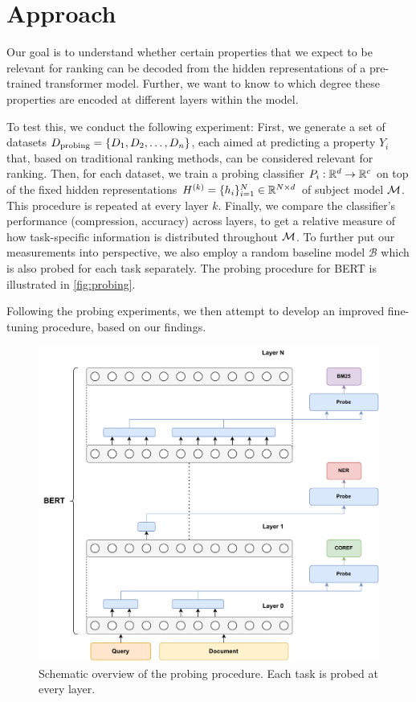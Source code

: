 \chapter{Approach}
\label{chap:approach}
Our goal is to understand whether certain properties that we expect to be relevant for ranking can be decoded from the hidden representations of a pre-trained transformer model. Further, we want to know to which degree these properties are encoded at different layers within the model.

To test this, we conduct the following experiment: First, we generate a set of datasets $D_{\text{probing}}=\{D_1, D_2, \dots, D_n \}$, each aimed at predicting a property $Y_i$ that, based on traditional ranking methods, can be considered relevant for ranking. Then, for each dataset, we train a probing classifier $P_i: \mathbb{R}^d \rightarrow \mathbb{R}^c$ on top of the fixed hidden representations $H^{(k)} = \{h_i\}_{i=1}^N \in \mathbb{R}^{N \times d}$ of subject model $\mathcal{M}$. This procedure is repeated at every layer $k$. Finally, we compare the classifier's performance (compression, accuracy) across layers, to get a relative measure of how task-specific information is distributed throughout $\mathcal{M}$. To further put our measurements into perspective, we also employ a random baseline model $\mathcal{B}$ which is also probed for each task separately. The probing procedure for BERT is illustrated in \autoref{fig:probing}.

Following the probing experiments, we then attempt to develop an improved fine-tuning procedure, based on our findings.

\begin{figure}[!h]
    \centering
    \includegraphics[width=\textwidth]{gfx/probing/probing}
    \caption{Schematic overview of the probing procedure. Each task is probed at every layer.}
    \label{fig:probing}
\end{figure}

